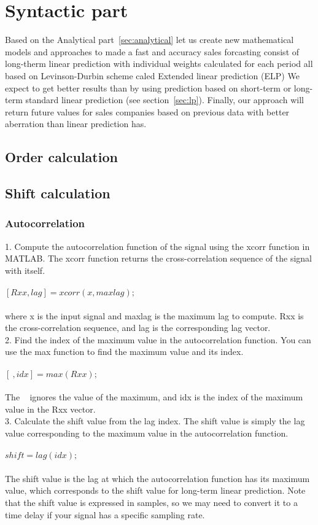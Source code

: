 \chapter{Syntactic part} \label{sec:syntactic}
Based on the Analytical part~\ref{sec:analytical} let us create new mathematical models and approaches to made a fast and accuracy sales forcasting
consist of long-therm linear prediction with individual weights calculated for each period all based on Levinson-Durbin scheme caled Extended linear
prediction (ELP)
We expect to get better results than by using prediction based on short-term or long-term standard linear prediction (see section~\ref{sec:lp}).
Finally, our approach will return future values for sales companies based on previous data with better aberration than linear prediction has.
\section{Order calculation} \label{sec:ordercalc}
\section{Shift calculation} \label{sec:shiftcalc}
    \subsection{Autocorrelation} \label{subsec:acorr}
    1. Compute the autocorrelation function of the signal using the xcorr function in MATLAB. The xcorr function returns the cross-correlation
    sequence of the signal with itself.\\
    \\
    $[Rxx, lag] = xcorr(x, maxlag);$\\
    \\
    where x is the input signal and maxlag is the maximum lag to compute. Rxx is the cross-correlation sequence, and lag is the corresponding lag vector.\\
    2. Find the index of the maximum value in the autocorrelation function. You can use the max function to find the maximum value and its index.\\
    \\
    $[~, idx] = max(Rxx);$\\
    \\
    The ~ ignores the value of the maximum, and idx is the index of the maximum value in the Rxx vector.\\
    3. Calculate the shift value from the lag index. The shift value is simply the lag value corresponding to the maximum value in the autocorrelation function.\\
    \\
    $shift = lag(idx);$\\
    \\
    The shift value is the lag at which the autocorrelation function has its maximum value, which corresponds to the shift value for long-term linear prediction.
    Note that the shift value is expressed in samples, so we may need to convert it to a time delay if your signal has a specific sampling rate.
